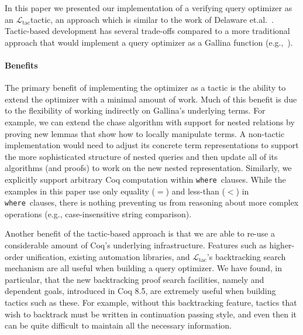 \documentclass[preprint]{sigplanconf}
\newcommand{\WHERE}{{\tt where}\relax\ifmmode\ \else\xspace\fi}
\newcommand{\ltac}[0]{\ensuremath{\mathcal{L}_{\mathrm{tac}}}}
\begin{document}
In this paper we presented our implementation of a verifying query optimizer as an \ltac tactic, an approach which is similar to the work of Delaware et.al.~\cite{DBLP:conf/popl/DelawarePGC15}.
Tactic-based development has several trade-offs compared to a more traditional approach that would implement a query optimizer as a Gallina function (e.g.,~\cite{coqdb}).


\paragraph{Benefits}
The primary benefit of implementing the optimizer as a tactic is the ability to extend the optimizer with a minimal amount of work.
Much of this benefit is due to the flexibility of working indirectly on Gallina's underlying terms.
For example, we can extend the chase algorithm with support for nested relations by proving new lemmas that show how to locally manipulate terms.
A non-tactic implementation would need to adjust its concrete term representations to support the more sophisticated structure of nested queries and then update all of its algorithms (and proofs) to work on the new nested representation.
Similarly, we explicitly support arbitrary Coq computation within \WHERE clauses.
While the examples in this paper use only equality ($=$) and less-than ($<$) in \WHERE clauses, there is nothing preventing us from reasoning about more complex operations (e.g., case-insensitive string comparison).

Another benefit of the tactic-based approach is that we are able to re-use a considerable amount of Coq's underlying infrastructure.
Features such as higher-order unification, existing automation libraries, and \ltac's backtracking search mechanism are all useful when building a query optimizer.
We have found, in particular, that the new backtracking proof search facilities, namely \coqe{+} and dependent goals, introduced in Coq 8.5, are extremely useful when building tactics such as these.
For example, without this backtracking feature, tactics that wish to backtrack must be written in continuation passing style, and even then it can be quite difficult to maintain all the necessary information.
\end{document}
